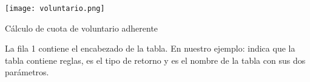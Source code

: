 \begin{table*}[h]
    \centering
    \texttt{[image: voluntario.png]}
    \caption{Cálculo de cuota de voluntario adherente}
    \label{tbl:cambio:original}
\end{table*}





La fila 1 contiene el encabezado de la tabla.
En nuestro ejemplo:  indica que la tabla contiene reglas,
 es el tipo de retorno y  es el nombre de la tabla con sus dos parámetros.

